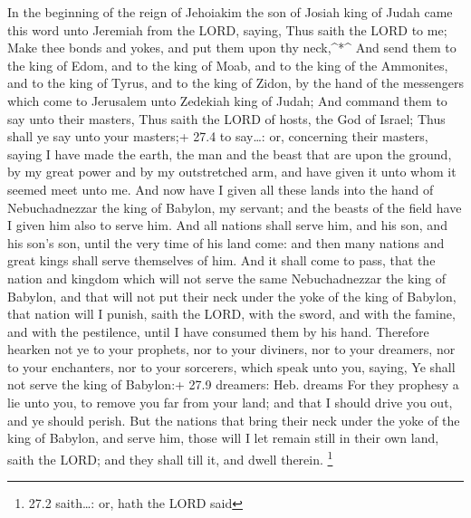  In the beginning of the reign of Jehoiakim the son of
Josiah king of Judah came this word unto Jeremiah from the LORD, saying,
 Thus saith the LORD to me; Make thee bonds and yokes, and
put them upon thy neck,\^{}*\^{}  And send them to the king
of Edom, and to the king of Moab, and to the king of the Ammonites, and
to the king of Tyrus, and to the king of Zidon, by the hand of the
messengers which come to Jerusalem unto Zedekiah king of Judah;
 And command them to say unto their masters, Thus saith the
LORD of hosts, the God of Israel; Thus shall ye say unto your masters;+
27.4 to say\ldots: or, concerning their masters, saying  I
have made the earth, the man and the beast that are upon the ground, by
my great power and by my outstretched arm, and have given it unto whom
it seemed meet unto me.  And now have I given all these
lands into the hand of Nebuchadnezzar the king of Babylon, my servant;
and the beasts of the field have I given him also to serve him.
 And all nations shall serve him, and his son, and his son's
son, until the very time of his land come: and then many nations and
great kings shall serve themselves of him.  And it shall
come to pass, that the nation and kingdom which will not serve the same
Nebuchadnezzar the king of Babylon, and that will not put their neck
under the yoke of the king of Babylon, that nation will I punish, saith
the LORD, with the sword, and with the famine, and with the pestilence,
until I have consumed them by his hand.  Therefore hearken
not ye to your prophets, nor to your diviners, nor to your dreamers, nor
to your enchanters, nor to your sorcerers, which speak unto you, saying,
Ye shall not serve the king of Babylon:+ 27.9 dreamers: Heb. dreams
 For they prophesy a lie unto you, to remove you far from
your land; and that I should drive you out, and ye should perish.
 But the nations that bring their neck under the yoke of
the king of Babylon, and serve him, those will I let remain still in
their own land, saith the LORD; and they shall till it, and dwell
therein. \footnote{27.2 saith\ldots: or, hath the LORD said}

